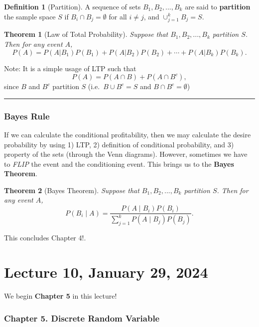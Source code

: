 \documentclass[
]{book}
\newtheorem{theorem}{Theorem}[chapter]
\theoremstyle{definition}
\newtheorem{definition}{Definition}[chapter]
\theoremstyle{definition}
\theoremstyle{definition}
\theoremstyle{definition}
\theoremstyle{remark}
\begin{document}
\begin{definition}[Partition]
A sequence of sets \(B_1,B_2,...,B_k\) are said to \textbf{partition} the sample space \(S\) if \(B_i \cap B_j = \emptyset\) for all \(i \ne j\), and \(\cup_{j=1}^k B_j = S\).
\end{definition}

\begin{theorem}[Law of Total Probability]
Suppose that \(B_1,B_2,...,B_k\) partition \(S\). Then for any event \(A\),
\[
P(A) = P(A | B_1) P(B_1) + P(A | B_2) P(B_2) + \cdots +P(A | B_k) P(B_k).
\]
\end{theorem}

Note: It is a simple usage of LTP such that
\[
  P(A) = P(A\cap B) + P(A \cap B^c),
\]
since \(B\) and \(B^c\) partition \(S\) (i.e.~\(B\cup B^c = S\) and \(B\cap B^c = \emptyset\))

\begin{center}\rule{0.5\linewidth}{0.5pt}\end{center}

\subsection{Bayes Rule}\label{bayes-rule}

If we can calculate the conditional profitability, then we may calculate the desire probability by using 1) LTP, 2) definition of conditional probability, and 3) property of the sets (through the Venn diagrams). However, sometimes we have to \emph{FLIP} the event and the conditioning event. This brings us to the \textbf{Bayes Theorem}.

\begin{theorem}[Bayes Theorem]
Suppose that \(B_1,B_2,...,B_k\) partition \(S\). Then for any event \(A\),
\[
P(B_i \mid A ) =  \frac{P(A \mid B_i)P(B_i)}{\sum_{j=1}^k P(A \mid B_j) P(B_j) }.
\]
\end{theorem}

This concludes Chapter 4!.

\chapter{Lecture 10, January 29, 2024}\label{lecture-10-january-29-2024}

We begin \textbf{Chapter 5} in this lecture!

\subsection{Chapter 5. Discrete Random Variable}\label{chapter-5.-discrete-random-variable}
\end{document}
